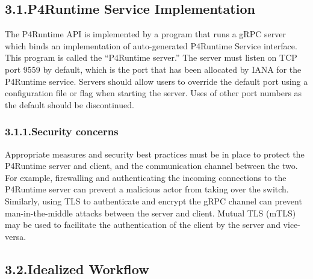 \documentclass[11pt]{article}
\begin{document}
{%
\subsection{3.1.\hspace*{0.5em}P4Runtime Service Implementation}\label{sec-p4runtime-service-implementation}%

\noindent{}The P4Runtime API is implemented by a program that runs a gRPC server which
binds an implementation of auto-generated P4Runtime Service interface. This
program is called the \textquotedblleft{}P4Runtime server.\textquotedblright{} The server must listen on TCP port
9559 by default, which is the port that has been allocated by IANA for the
P4Runtime service. Servers should allow users to override the default port
using a configuration file or flag when starting the server. Uses of other
port numbers as the default should be discontinued.%

\subsubsection{3.1.1.\hspace*{0.5em}Security concerns}\label{sec-security-concerns}%

\noindent{}Appropriate measures and security best practices must be in place to protect
the P4Runtime server and client, and the communication channel between the two.
For example, firewalling and authenticating the incoming connections to the
P4Runtime server can prevent a malicious actor from taking over the switch.
Similarly, using TLS to authenticate and encrypt the gRPC channel can prevent
man-in-the-middle attacks between the server and client. Mutual TLS (mTLS) may
be used to facilitate the authentication of the client by the server and
vice-versa.%

\subsection{3.2.\hspace*{0.5em}Idealized Workflow}\label{sec-idealized-workflow}%

}
\end{document}
